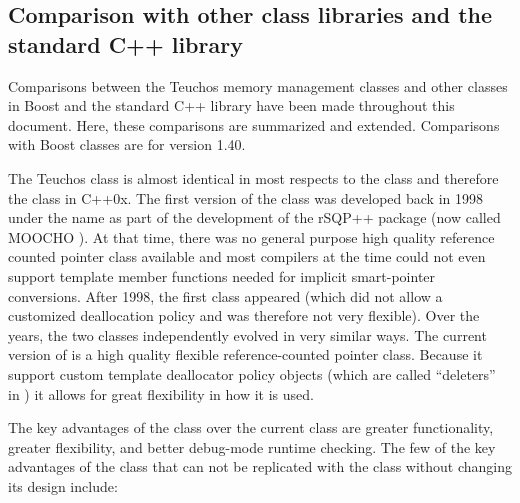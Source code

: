 \documentclass[pdf,ps2pdf,11pt]{SANDreport}
\begin{document}
%
{}\subsection{Comparison with other class libraries and the standard
C++ library}
%

Comparisons between the Teuchos memory management classes and other
classes in Boost and the standard C++ library have been made
throughout this document.  Here, these comparisons are summarized and
extended.  Comparisons with Boost classes are for version 1.40.

The Teuchos class {} is almost identical in most respects to
the {} class and therefore the
{} class in C++0x.  The first version of the
class {} was developed back in 1998 under the name
{} as part of the development of the
rSQP++ package {}\cite{rSQP++} (now called MOOCHO {}\cite{MOOCHO}).
At that time, there was no general purpose high quality reference
counted pointer class available and most compilers at the time could
not even support template member functions needed for implicit
smart-pointer conversions.  After 1998, the first
{} class appeared (which did not allow a
customized deallocation policy and was therefore not very flexible).
Over the years, the two classes independently evolved in very similar
ways.  The current version of {} is a high
quality flexible reference-counted pointer class.  Because it support
custom template deallocator policy objects (which are called
``deleters'' in {}) it allows for great
flexibility in how it is used.

The key advantages of the {} class over the current
{} class are greater functionality, greater
flexibility, and better debug-mode runtime checking. The few of the
key advantages of the {} class that can not be replicated
with the {} class without changing its design
include:
\end{document}
